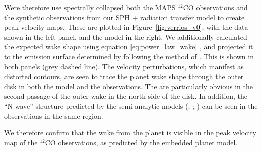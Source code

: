 Were therefore use spectrally collapsed both the MAPS $^{12}$CO observations \citep{oberg2021} and the synthetic observations from our SPH + radiation transfer model to create peak velocity maps.
These are plotted in Figure~\ref{fig:verrios_v0}, with the data shown in the left panel, and the model in the right.
We additionally calculated the expected wake shape using equation \ref{eq:power_law_wake} \citep{ogilvie2002,rafikov2002a}, and projected it to the emission surface determined by \citet{law2021a} following the method of \citet{calcino2022}.
This is shown in both panels (grey dashed line).
The velocity perturbations, which manifest as distorted contours, are seen to trace the planet wake shape through the outer disk in both the model and the observations.
The are particularly obvious in the second passage of the outer wake in the north side of the disk.
In addition, the ``N-wave'' structure predicted by the semi-analytic models (\citealt{goodman2001}; \citealt{rafikov2002a}; ) can be seen in the observations in the same region.

We therefore confirm that the wake from the planet is visible in the peak velocity map of the $^{12}$CO observations, as predicted by the embedded planet model.




